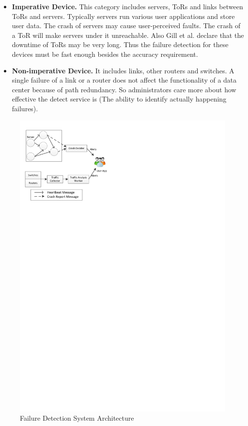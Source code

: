 \documentclass{sig-alternate-05-2015}
\begin{document}
\begin{itemize}
\item \textbf{Imperative Device.} This category includes servers, ToRs and links between ToRs and servers. Typically servers run various user applications and store user data. The crash of servers may cause user-perceived faults. The crash of a ToR will make servers under it unreachable. Also Gill et al. declare that the downtime of ToRs may be very long. Thus the failure detection for these devices must be fast enough besides the accuracy requirement.

\item \textbf{Non-imperative Device.} It includes links, other routers and switches. A single failure of a link or a router does not affect the functionality of a data center because of path redundancy. So administrators care more about how effective the detect service is (The ability to identify actually happening failures).

\end{itemize}

\begin{figure}
\centering
\includegraphics{system}
\caption{Failure Detection System Architecture}
\end{figure}
\end{document}
